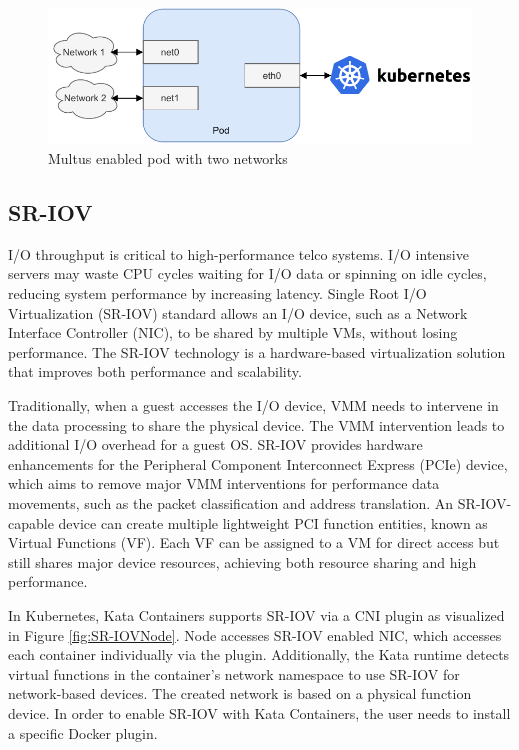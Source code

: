 \begin{figure}[ht]
  \begin{center}
    \includegraphics[width=13.5cm]{images/Multus.pdf}
    \caption{Multus enabled pod with two networks}
    \label{fig:Multus}
  \end{center}
\end{figure}

\subsection{SR-IOV}
\label{section:SR-IOV}

I/O throughput is critical to high-performance telco systems. I/O intensive servers may waste CPU cycles waiting for I/O data or spinning on idle cycles, reducing system performance by increasing latency. Single Root I/O Virtualization (SR-IOV) standard allows an I/O device, such as a Network Interface Controller (NIC), to be shared by multiple VMs, without losing performance. The SR-IOV technology is a hardware-based virtualization solution that improves both performance and scalability. \cite{Dong2012}

Traditionally, when a guest accesses the I/O device, VMM needs to intervene in the data processing to share the physical device. The VMM intervention leads to additional I/O overhead for a guest OS. SR-IOV provides hardware enhancements for the Peripheral Component Interconnect Express (PCIe) device, which aims to remove major VMM interventions for performance data movements, such as the packet classification and address translation. An SR-IOV-capable device can create multiple lightweight PCI function entities, known as Virtual Functions (VF). Each VF can be assigned to a VM for direct access but still shares major device resources, achieving both resource sharing and high performance. \cite{Dong2012}

In Kubernetes, Kata Containers supports SR-IOV via a CNI plugin \cite{SR-IOVOpenShift} as visualized in Figure \ref{fig:SR-IOVNode}. Node accesses SR-IOV enabled NIC, which accesses each container individually via the plugin. Additionally, the Kata runtime detects virtual functions in the container's network namespace to use SR-IOV for network-based devices. The created network is based on a physical function device. In order to enable SR-IOV with Kata Containers, the user needs to install a specific Docker plugin. \cite{SR-IOVKataContainers}

